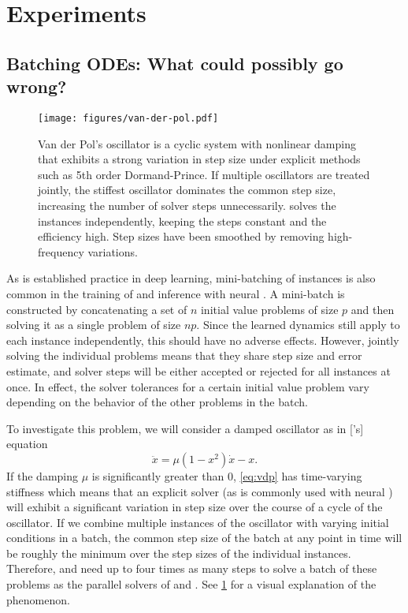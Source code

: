 \documentclass{article}
\begin{document}
\section{Experiments}\label{sec:experiments}

\subsection{Batching ODEs: What could possibly go wrong?}\label{sec:batching}

\begin{figure}[tbp]
  \centering
  \texttt{[image: figures/van-der-pol.pdf]}
  \caption{Van der Pol's oscillator is a cyclic system with nonlinear damping that exhibits a strong variation in step size under explicit methods such as 5th order Dormand-Prince. If multiple oscillators are treated jointly, the stiffest oscillator dominates the common step size, increasing the number of solver steps unnecessarily. \torchode{} solves the instances independently, keeping the steps constant and the efficiency high. Step sizes have been smoothed by removing high-frequency variations.}\label{fig:van-der-pol}
\end{figure}

As is established practice in deep learning, mini-batching of instances is also common in the training of and inference with neural \ODEs{}. A mini-batch is constructed by concatenating a set of $n$ initial value problems of size $p$ and then solving it as a single problem of size $np$. Since the learned dynamics still apply to each instance independently, this should have no adverse effects. However, jointly solving the individual problems means that they share step size and error estimate, and solver steps will be either accepted or rejected for all instances at once. In effect, the solver tolerances for a certain initial value problem vary depending on the behavior of the other problems in the batch.

To investigate this problem, we will consider a damped oscillator as in ['s] equation
\begin{equation}
  \ddot{x} = \mu(1 - x^{2})\dot{x} - x. \label{eq:vdp}
\end{equation}
If the damping $\mu$ is significantly greater than $0$, \cref{eq:vdp} has time-varying stiffness which means that an explicit solver (as is commonly used with neural \ODEs{}) will exhibit a significant variation in step size over the course of a cycle of the oscillator. If we combine multiple instances of the oscillator with varying initial conditions in a batch, the common step size of the batch at any point in time will be roughly the minimum over the step sizes of the individual instances. Therefore, \torchdiffeq{} and \torchdyn{} need up to four times as many steps to solve a batch of these problems as the parallel solvers of \torchode{} and \diffrax{}. See \cref{fig:van-der-pol} for a visual explanation of the phenomenon.
\end{document}
